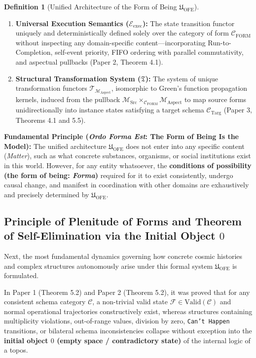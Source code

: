 \documentclass[11pt,a4paper]{article}
\theoremstyle{definition}
\newtheorem{definition}{Definition}[section]
\theoremstyle{plain}
\begin{document}
\begin{definition}[Unified Architecture of the Form of Being $\mathfrak{U}_{\mathrm{OFE}}$]
\begin{enumerate}
    \item \textbf{Universal Execution Semantics ($\mathcal{E}_{\mathrm{exec}}$):} The state transition functor uniquely and deterministically defined solely over the category of form $\mathcal{C}_{\mathrm{FORM}}$ without inspecting any domain-specific content---incorporating Run-to-Completion, self-event priority, FIFO ordering with parallel commutativity, and aspectual pullbacks (Paper 2, Theorem 4.1).
    \item \textbf{Structural Transformation System ($\mathfrak{T}$):} The system of unique transformation functors $\mathcal{T}_{\mathcal{M}_{\mathrm{Aspect}}}$, isomorphic to Green's function propagation kernels, induced from the pullback $\mathcal{M}_{\mathrm{Src}} \times_{\mathcal{C}_{\mathrm{FORM}}} \mathcal{M}_{\mathrm{Aspect}}$ to map source forms unidirectionally into instance states satisfying a target schema $\mathcal{C}_{\mathrm{Targ}}$ (Paper 3, Theorems 4.1 and 5.5).
\end{enumerate}
\end{definition}

\noindent\textbf{Fundamental Principle (\textit{Ordo Forma Est}: The Form of Being Is the Model):}
The unified architecture $\mathfrak{U}_{\mathrm{OFE}}$ does not enter into any specific content (\textit{Matter}), such as what concrete substances, organisms, or social institutions exist in this world. However, for any entity whatsoever, the \textbf{conditions of possibility (the form of being: \textit{Forma})} required for it to exist consistently, undergo causal change, and manifest in coordination with other domains are exhaustively and precisely determined by $\mathfrak{U}_{\mathrm{OFE}}$.

\subsection{Principle of Plenitude of Forms and Theorem of Self-Elimination via the Initial Object $0$}
Next, the most fundamental dynamics governing how concrete cosmic histories and complex structures autonomously arise under this formal system $\mathfrak{U}_{\mathrm{OFE}}$ is formulated.

In Paper 1 (Theorem 5.2) and Paper 2 (Theorem 5.2), it was proved that for any consistent schema category $\mathcal{C}$, a non-trivial valid state $\mathcal{F} \in \mathrm{Valid}(\mathcal{C})$ and normal operational trajectories constructively exist, whereas structures containing multiplicity violations, out-of-range values, division by zero, \texttt{Can't Happen} transitions, or bilateral schema inconsistencies collapse without exception into the \textbf{initial object $0$ (empty space / contradictory state)} of the internal logic of a topos.
\end{document}
